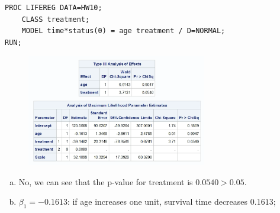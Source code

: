 \documentclass{elegantbook}
\begin{document}
\begin{solution}
    \begin{verbatim}
PROC LIFEREG DATA=HW10;
    CLASS treatment;
    MODEL time*status(0) = age treatment / D=NORMAL;
RUN;
    \end{verbatim}
    \begin{figure}[H]
        \centering
        \includegraphics[width=0.7\textwidth]{HW10_3.png}
    \end{figure}
\begin{enumerate}[(a)]
    \item No, we can see that the p-value for treatment is $0.0540>0.05$. 
    \item $\beta_1=-0.1613$: if age increases one unit, survival time decreases $0.1613$; 
    

\end{enumerate}
\end{solution}
\end{document}
